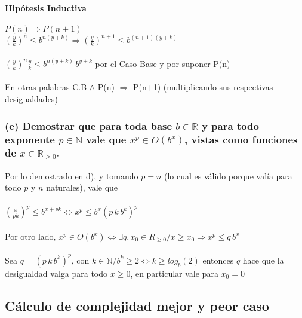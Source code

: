 \documentclass[10pt, a4paper]{article}
\begin{document}
\paragraph*{Hipótesis Inductiva}
$P(n) \Rightarrow P(n+1)$ \\

$(\frac{y}{k})^n \le b^{n(y+k)} \Rightarrow (\frac{y}{k})^{n+1} \le b^{(n+1)(y+k)}$\\ \\
$(\frac{y}{k})^n \frac{y}{k} \le b^{n(y+k)} \, b^{y+k}$ por el Caso Base y por suponer P(n)\\ \\
En otras palabras C.B $\wedge$ P(n) $\Rightarrow$ P(n+1) (multiplicando sus respectivas desigualdades)
\newpage
\subsubsection*{(e) Demostrar que para toda base $b \in \mathbb{R}$ y para todo exponente $p \in \mathbb{N}$ vale que $x^p \in O(b^x)$, vistas como funciones de $x \in \mathbb R_{\ge 0}$.}

Por lo demostrado en d), y tomando $p=n$ (lo cual es válido porque valía para todo $p$ y $n$ naturales), vale que \\ \\
$(\frac{x}{pk})^p \le b^{x + pk} \Leftrightarrow \boxed{x^p \le b^x (p\,k\,b^k)^p}$\\ \\
Por otro lado, $x^p \in O(b^x) \Leftrightarrow \exists q, x_0 \in R_{\ge 0} / x\ge x_0 \Rightarrow x^p \le q \, b^x$\\ \\
Sea $q = (p\,k\,b^k)^p$, con $k \in \mathbb{N} / b^k \ge 2 \Leftrightarrow k \ge log_{b}(2)$ entonces $q$ hace que la desigualdad valga para todo $x \ge 0$, en particular vale para $x_0 = 0$

\subsection{Cálculo de complejidad mejor y peor caso}
\end{document}

